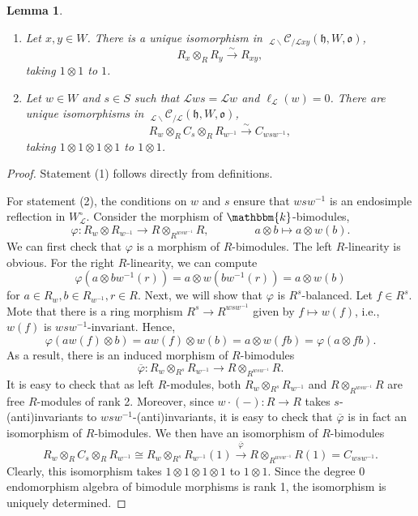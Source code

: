 \documentclass{amsart}
\renewcommand{\k}{\mathbbm{k}}
\newcommand{\scrL}{\mathcal{L}}
\newcommand{\fr}[1]{\mathfrak{#1}}
\newcommand{\Cmon}[2]{\:_{#1 \backslash} \mathcal{C}_{/ #2} }
\newtheorem{lemma}[subsubsection]{Lemma}
\theoremstyle{definition}
\numberwithin{equation}{subsection}
\begin{document}
\begin{lemma}\label{lem:soergel_product_formulas}
    \begin{enumerate}
        \item Let $x,y \in W$. There is a unique isomorphism in $\Cmon{\scrL}{\scrL xy} (\fr{h}, W, \fr{o})$,
            \[R_x \otimes_R R_y \stackrel{\sim}{\to} R_{xy},\]
            taking $1 \otimes 1$ to $1$.
        \item  Let $w \in W$ and $s \in S$ such that $\scrL w s = \scrL w$ and $\ell_{\scrL} (w) = 0$.
        There are unique isomorphisms in $\Cmon{\scrL}{\scrL} (\fr{h}, W, \fr{o})$,
        \[R_w \otimes_R C_s \otimes_R R_{w^{-1}} \stackrel{\sim}{\to} C_{wsw^{-1}},\]
        taking $1 \otimes 1 \otimes 1 \otimes 1$ to $1 \otimes 1$.
    \end{enumerate}
\end{lemma}
\begin{proof}
    Statement (1) follows directly from definitions. 
    
    For statement (2), the conditions on $w$ and $s$ ensure that $wsw^{-1}$ is an endosimple reflection in $W_{\scrL}^\circ$.
    Consider the morphism of $\k$-bimodules,
    \begin{equation}
        \varphi : R_w \otimes R_{w^{-1}} \to R \otimes_{R^{wsw^{-1}}} R, \qquad\qquad a \otimes b \mapsto a \otimes w(b).
    \end{equation}
    We can first check that $\varphi$ is a morphism of $R$-bimodules. 
    The left $R$-linearity is obvious. For the right $R$-linearity, we can compute
    \[\varphi (a \otimes bw^{-1} (r)) = a \otimes w(bw^{-1} (r)) = a \otimes w (b)\]
    for $a \in R_w, b\in R_{w^{-1}}, r \in R$. Next, we will show that $\varphi$ is $R^s$-balanced.
    Let $f \in R^s$. Mote that there is a ring morphism $R^s \to R^{wsw^{-1}}$ given by $f \mapsto w(f)$, i.e., $w (f)$ is $wsw^{-1}$-invariant.
    Hence,
    \begin{equation*}
        \varphi ( a w(f) \otimes b) = aw(f) \otimes w(b) = a \otimes w(f b) = \varphi (a \otimes fb).
    \end{equation*}
    As a result, there is an induced morphism of $R$-bimodules
    \[\overline{\varphi} : R_w \otimes_{R^s} R_{w^{-1}} \to R \otimes_{R^{wsw^{-1}}} R.\]
    It is easy to check that as left $R$-modules, both $R_w \otimes_{R^s} R_{w^{-1}}$ and $ R \otimes_{R^{wsw^{-1}}} R$ are free $R$-modules of rank 2.
    Moreover, since $w \cdot (-) : R \to R$ takes $s$-(anti)invariants to $wsw^{-1}$-(anti)invariants, it is easy to check that $\overline{\varphi}$ is in fact an isomorphism of $R$-bimodules.
    We then have an isomorphism of $R$-bimodules
    \[R_w \otimes_R C_s \otimes_R R_{w^{-1}} \cong R_w \otimes_{R^s} R_{w^{-1}} (1) \stackrel{\overline{\varphi}}{\to}  R \otimes_{R^{wsw^{-1}}} R (1) = C_{wsw^{-1}}.\]  
    Clearly, this isomorphism takes $1 \otimes 1 \otimes 1 \otimes 1$ to $1 \otimes 1$. Since the degree 0 endomorphism algebra of bimodule morphisms is rank 1, the isomorphism is uniquely determined.  
\end{proof}
\end{document}
